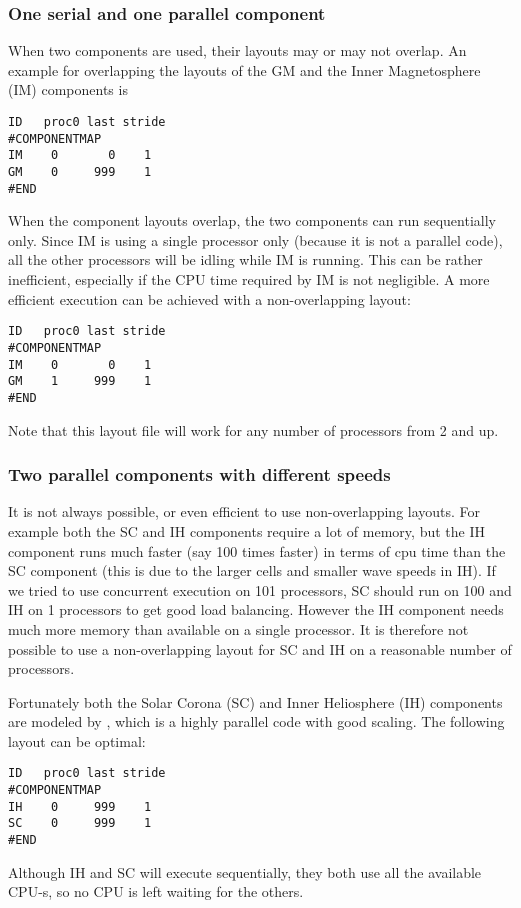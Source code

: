 \subsubsection{One serial and one parallel component}

When two components are used, their layouts may or may not overlap.
An example for overlapping the layouts of the GM and the
Inner Magnetosphere (IM) components is
\begin{verbatim}
ID   proc0 last stride
#COMPONENTMAP
IM    0       0    1
GM    0     999    1
#END
\end{verbatim}
When the component layouts overlap, the two components can run
sequentially only. Since IM is using a single processor only
(because it is not a parallel code), all the other processors 
will be idling while IM is running. This can be rather inefficient,
especially if the CPU time required by IM is not negligible.
A more efficient execution can be achieved with a non-overlapping layout:
\begin{verbatim}
ID   proc0 last stride
#COMPONENTMAP
IM    0       0    1
GM    1     999    1
#END
\end{verbatim}
Note that this layout file will work for any number 
of processors from 2 and up.

\subsubsection{Two parallel components with different speeds}

It is not always possible, or even efficient to use non-overlapping
layouts. For example both the SC and IH components require a lot of memory,
but the IH component runs much faster (say 100 times faster) 
in terms of cpu time than the SC component (this is due to the 
larger cells and smaller wave speeds in IH).
If we tried to use concurrent execution on 101 processors,
SC should run on 100 and IH on 1 processors to get good load balancing.
However the IH component needs much more memory than available
on a single processor. It is therefore not possible to use a non-overlapping
layout for SC and IH on a reasonable number of processors.

Fortunately both the Solar Corona (SC) and Inner Heliosphere (IH)
components are modeled by \BATSRUS, which is a highly parallel code
with good scaling. The following layout can be optimal:
\begin{verbatim}
ID   proc0 last stride
#COMPONENTMAP
IH    0     999    1
SC    0     999    1
#END
\end{verbatim}
Although IH and SC will execute sequentially, they both
use all the available CPU-s, so no CPU is left waiting for the others.

